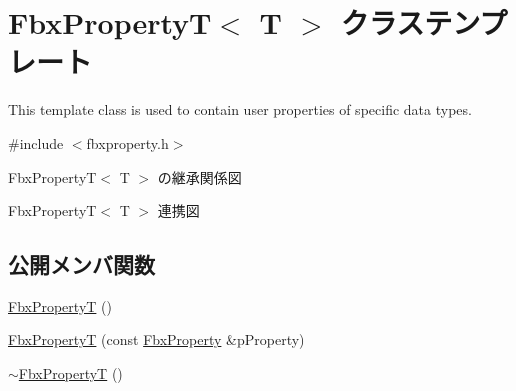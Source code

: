 \hypertarget{class_fbx_property_t}{}\section{Fbx\+PropertyT$<$ T $>$ クラステンプレート}
\label{class_fbx_property_t}


This template class is used to contain user properties of specific data types.  




{\ttfamily \#include $<$fbxproperty.\+h$>$}



Fbx\+PropertyT$<$ T $>$ の継承関係図


Fbx\+PropertyT$<$ T $>$ 連携図
\subsection*{公開メンバ関数}
\begin{DoxyCompactItemize}
\item 
\hyperlink{class_fbx_property_t_a60e994b93527d29bf782be402dfe430f}{Fbx\+PropertyT} ()
\item 
\hyperlink{class_fbx_property_t_afa5d35b87d71aa68d84f12fb39de89e4}{Fbx\+PropertyT} (const \hyperlink{class_fbx_property}{Fbx\+Property} \&p\+Property)
\item 
\hyperlink{class_fbx_property_t_a26fa61ca6f7ef315a7121d0190080622}{$\sim$\+Fbx\+PropertyT} ()
\end{DoxyCompactItemize}
